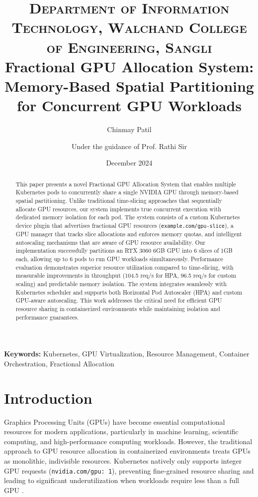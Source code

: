 \documentclass[10pt,twocolumn,letterpaper]{article}
\title{%
\vspace{-1in} 	
\usefont{OT1}{bch}{b}{n}
\normalfont \normalsize \textsc{Department of Information Technology, Walchand College of Engineering, Sangli} \\ [10pt]
\huge Fractional GPU Allocation System: Memory-Based Spatial Partitioning for Concurrent GPU Workloads \\
}
\author[1]{Chinmay Patil}
\author[2]{Under the guidance of Prof. Rathi Sir}
\affil[1]{\small{Department of Information Technology, Walchand College of Engineering, Sangli}}
\affil[2]{\small{Project Mentor}}
\date{December 2024}
\begin{document}
\maketitle
{}

\begin{abstract}
This paper presents a novel Fractional GPU Allocation System that enables multiple Kubernetes pods to concurrently share a single NVIDIA GPU through memory-based spatial partitioning. Unlike traditional time-slicing approaches that sequentially allocate GPU resources, our system implements true concurrent execution with dedicated memory isolation for each pod. The system consists of a custom Kubernetes device plugin that advertises fractional GPU resources (\texttt{example.com/gpu-slice}), a GPU manager that tracks slice allocations and enforces memory quotas, and intelligent autoscaling mechanisms that are aware of GPU resource availability. Our implementation successfully partitions an RTX 3060 6GB GPU into 6 slices of 1GB each, allowing up to 6 pods to run GPU workloads simultaneously. Performance evaluation demonstrates superior resource utilization compared to time-slicing, with measurable improvements in throughput (104.5 req/s for HPA, 96.5 req/s for custom scaling) and predictable memory isolation. The system integrates seamlessly with Kubernetes scheduler and supports both Horizontal Pod Autoscaler (HPA) and custom GPU-aware autoscaling. This work addresses the critical need for efficient GPU resource sharing in containerized environments while maintaining isolation and performance guarantees.
\end{abstract}

\textbf{Keywords:} Kubernetes, GPU Virtualization, Resource Management, Container Orchestration, Fractional Allocation

\section{Introduction}

Graphics Processing Units (GPUs) have become essential computational resources for modern applications, particularly in machine learning, scientific computing, and high-performance computing workloads. However, the traditional approach to GPU resource allocation in containerized environments treats GPUs as monolithic, indivisible resources. Kubernetes natively only supports integer GPU requests (\texttt{nvidia.com/gpu: 1}), preventing fine-grained resource sharing and leading to significant underutilization when workloads require less than a full GPU \cite{nvidia_device_plugin}.
\end{document}
